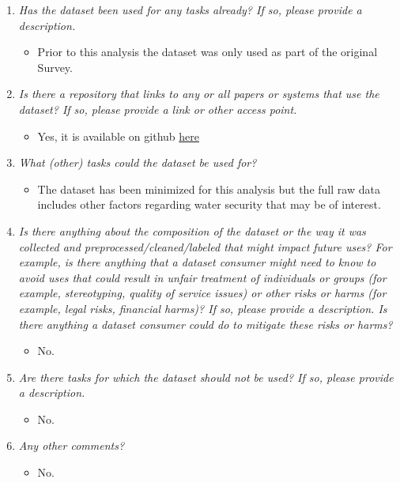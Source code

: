 \documentclass[
]{article}
\providecommand{\tightlist}{%
  \setlength{\itemsep}{0pt}\setlength{\parskip}{0pt}}
\begin{document}
\begin{enumerate}
\def\labelenumi{\arabic{enumi}.}
\tightlist
\item
  \emph{Has the dataset been used for any tasks already? If so, please
  provide a description.}

  \begin{itemize}
  \tightlist
  \item
    Prior to this analysis the dataset was only used as part of the
    original Survey.
  \end{itemize}
\item
  \emph{Is there a repository that links to any or all papers or systems
  that use the dataset? If so, please provide a link or other access
  point.}

  \begin{itemize}
  \tightlist
  \item
    Yes, it is available on github
    \href{https://github.com/Jon-Goodwin/Final}{here}
  \end{itemize}
\item
  \emph{What (other) tasks could the dataset be used for?}

  \begin{itemize}
  \tightlist
  \item
    The dataset has been minimized for this analysis but the full raw
    data includes other factors regarding water security that may be of
    interest.
  \end{itemize}
\item
  \emph{Is there anything about the composition of the dataset or the
  way it was collected and preprocessed/cleaned/labeled that might
  impact future uses? For example, is there anything that a dataset
  consumer might need to know to avoid uses that could result in unfair
  treatment of individuals or groups (for example, stereotyping, quality
  of service issues) or other risks or harms (for example, legal risks,
  financial harms)? If so, please provide a description. Is there
  anything a dataset consumer could do to mitigate these risks or
  harms?}

  \begin{itemize}
  \tightlist
  \item
    No.
  \end{itemize}
\item
  \emph{Are there tasks for which the dataset should not be used? If so,
  please provide a description.}

  \begin{itemize}
  \tightlist
  \item
    No.
  \end{itemize}
\item
  \emph{Any other comments?}

  \begin{itemize}
  \tightlist
  \item
    No.
  \end{itemize}
\end{enumerate}
\end{document}
